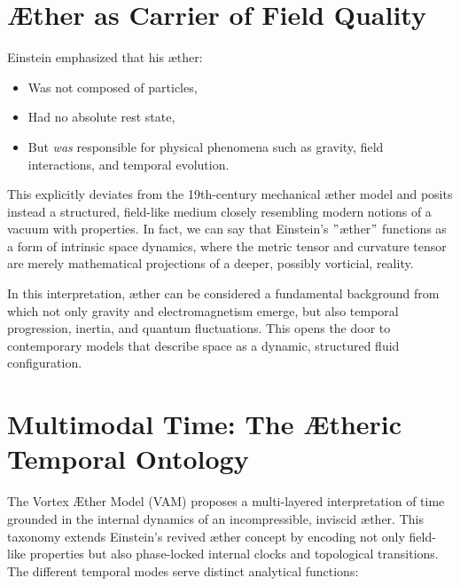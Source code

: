 \section{Æther as Carrier of Field Quality}

    Einstein emphasized that his æther:
    \begin{itemize}
        \item Was not composed of particles,
        \item Had no absolute rest state,
        \item But \emph{was} responsible for physical phenomena such as gravity, field interactions, and temporal evolution.
    \end{itemize}

    This explicitly deviates from the 19th-century mechanical æther model and posits instead a structured, field-like medium closely resembling modern notions of a vacuum with properties. In fact, we can say that Einstein's \("\)æther\("\) functions as a form of intrinsic space dynamics, where the metric tensor and curvature tensor are merely mathematical projections of a deeper, possibly vorticial, reality.

    In this interpretation, æther can be considered a fundamental background from which not only gravity and electromagnetism emerge, but also temporal progression, inertia, and quantum fluctuations. This opens the door to contemporary models that describe space as a dynamic, structured fluid configuration.

\section{Multimodal Time: The Ætheric Temporal Ontology}

    The Vortex Æther Model (VAM) proposes a multi-layered interpretation of time grounded in the internal dynamics of an incompressible, inviscid æther. This taxonomy extends Einstein’s revived æther concept by encoding not only field-like properties but also phase-locked internal clocks and topological transitions. The different temporal modes serve distinct analytical functions:

